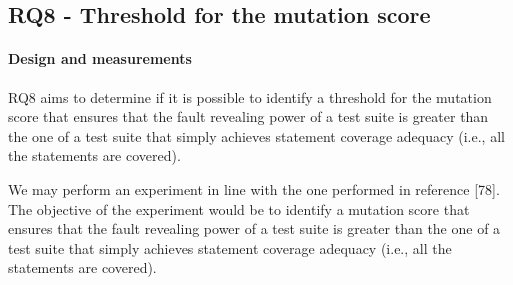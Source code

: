 %
 





\clearpage
\subsection{RQ8 - Threshold for the mutation score}

\paragraph{Design and measurements}
\label{sec:exp:thr}

RQ8 aims to determine if it is possible to identify a threshold for the mutation score that ensures that the fault revealing power of a test suite is greater than the one of a test suite that simply achieves statement coverage adequacy (i.e., all the statements are covered).


We may perform an experiment in line with the one performed in reference [78]. The objective of the experiment would be to identify a mutation score that ensures that the fault revealing power of a test suite is greater than the one of a test suite that simply achieves statement coverage adequacy (i.e., all the statements are covered). 

